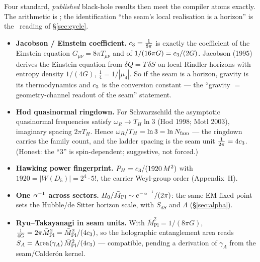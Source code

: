 \noindent Four standard, \emph{published} black-hole results then meet the compiler atoms exactly. The
arithmetic is \mE; the identification ``the seam's local realisation is a horizon'' is the \mC\ reading of
\S\ref{sec:cycle}.
\begin{itemize}[leftmargin=1.4em]
\item \textbf{Jacobson / Einstein coefficient.} $c_3=\tfrac1{8\pi}$ is exactly the coefficient of the
Einstein equation $G_{\mu\nu}=8\pi T_{\mu\nu}$ and of $1/(16\pi G)=c_3/(2G)$. Jacobson (1995) derives
the Einstein equation from $\delta Q=T\,\delta S$ on local Rindler horizons with entropy density
$1/(4G)$, $\tfrac14=1/|\mu_4|$. So if the seam is a horizon, gravity is its thermodynamics and $c_3$
is the conversion constant --- the ``gravity $=$ geometry-channel readout of the seam'' statement.
\item \textbf{Hod quasinormal ringdown.} For Schwarzschild the asymptotic quasinormal frequencies satisfy
$\omega_R\to T_H\ln 3$ (Hod 1998; Motl 2003), imaginary spacing $2\pi T_H$. Hence
$\omega_R/T_H=\ln 3=\ln N_{\mathrm{fam}}$ --- the ringdown carries the family count, and the ladder spacing is the
seam unit $\tfrac1{2\pi}=4c_3$. (Honest: the ``$3$'' is spin-dependent; suggestive, not forced.)
\item \textbf{Hawking power fingerprint.} $P_H=c_3/(1920\,M^2)$ with $1920=|W(D_5)|=2^4\cdot5!$, the
carrier Weyl-group order (Appendix~H).
\item \textbf{One $\alpha^{-1}$ across sectors.} $H_0/\bar M_{\mathrm{Pl}}\sim e^{-\alpha^{-1}}/(2\pi)$: the same EM
fixed point sets the Hubble/de Sitter horizon scale, with $S_{dS}$ and $\Lambda$ (\S\ref{sec:alpha}).
\item \textbf{Ryu--Takayanagi in seam units.} With $\bar M_{\mathrm{Pl}}^2=1/(8\pi G)$,
$\tfrac1{4G}=2\pi\bar M_{\mathrm{Pl}}^2=\bar M_{\mathrm{Pl}}^2/(4c_3)$, so the holographic entanglement
area reads $S_A=\operatorname{Area}(\gamma_A)\,\bar M_{\mathrm{Pl}}^2/(4c_3)$ --- compatible, pending a
derivation of $\gamma_A$ from the seam/Calder\'on kernel.
\end{itemize}
\,

